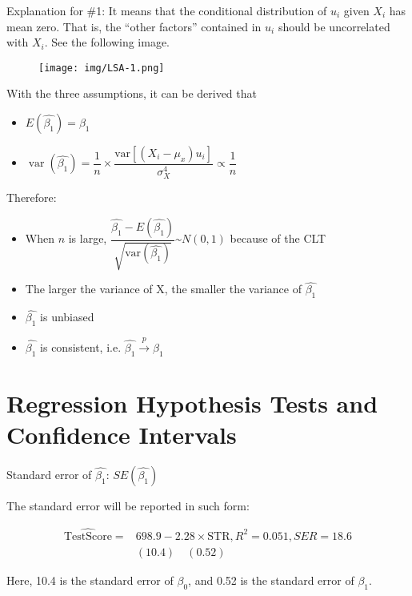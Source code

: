 \documentclass{article}
\begin{document}
Explanation for \#1:
It means that the conditional distribution of $u_i$ given $X_i$ has mean zero.
That is, the ``other factors'' contained in $u_i$ should be uncorrelated with $X_i$.
See the following image.

\begin{figure}[H]
	\centering
	\texttt{[image: img/LSA-1.png]}
\end{figure}

With the three assumptions, it can be derived that

\begin{itemize}
	\item $E\left(\hat{\beta_1}\right) = \beta_1$
	\item $\operatorname{var}\left(\hat{\beta_1}\right) = \dfrac{1}{n} \times \dfrac{
			      \text{var}\left[\left(X_i - \mu_x\right)u_i\right]
		      }{\sigma^4_X}\propto \dfrac{1}{n}$
\end{itemize}

Therefore:
\begin{itemize}
	\item When $n$ is large, $\dfrac{
			      \hat{\beta_1} - E(\hat{\beta_1})
		      }{\sqrt{\text{var}\left(\hat{\beta_1}\right)}
		      } \text{\textasciitilde} N(0,1)$ because of the CLT
	\item The larger the variance of X, the smaller the variance of $\hat{\beta_1}$
	\item $\hat{\beta_1}$ is unbiased
	\item $\hat{\beta_1}$ is consistent, i.e. $\hat{\beta_1} \xrightarrow{p} \beta_1$
\end{itemize}


\section{Regression Hypothesis Tests and Confidence Intervals}

Standard error of $\hat{\beta_1}$: $SE(\hat{\beta_1})$

The standard error will be reported in such form:

\[
	\begin{aligned}
		\widehat{\text{TestScore}} ={} & 698.9 - 2.28 \times \text{STR}, R^2 = 0.051, SER = 18.6 \\
		                               & (10.4) \quad (0.52)
	\end{aligned}
\]

Here, 10.4 is the standard error of $\beta_0$, and 0.52 is the standard error of $\beta_1$.
\end{document}
